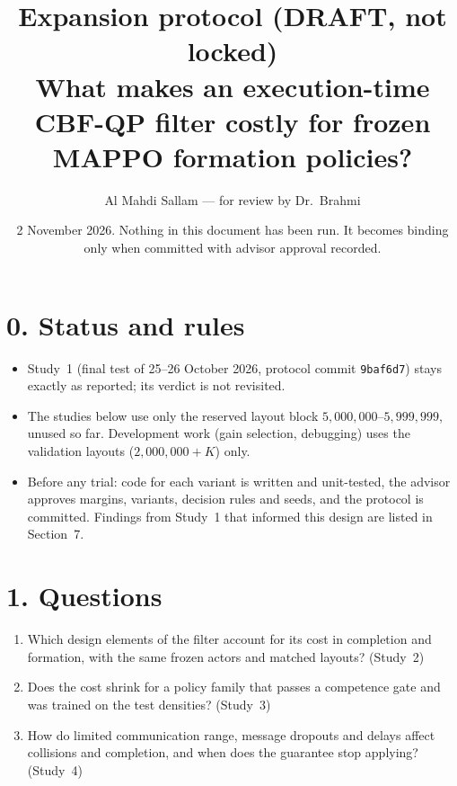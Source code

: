 \documentclass[10pt]{article}
\title{Expansion protocol (DRAFT, not locked)\\ What makes an execution-time CBF-QP filter costly for frozen MAPPO formation policies?}
\author{Al Mahdi Sallam --- for review by Dr.~Brahmi}
\date{2 November 2026. Nothing in this document has been run. It becomes binding only when committed with advisor approval recorded.}
\begin{document}
\maketitle

\section*{0. Status and rules}
\begin{itemize}
\item Study~1 (final test of 25--26 October 2026, protocol commit \texttt{9baf6d7}) stays exactly as reported; its verdict is not revisited.
\item The studies below use only the reserved layout block $5{,}000{,}000$--$5{,}999{,}999$, unused so far. Development work (gain selection, debugging) uses the validation layouts ($2{,}000{,}000+K$) only.
\item Before any trial: code for each variant is written and unit-tested, the advisor approves margins, variants, decision rules and seeds, and the protocol is committed. Findings from Study~1 that informed this design are listed in Section~7.
\end{itemize}

\section*{1. Questions}
\begin{enumerate}[label=Q\arabic*.]
\item Which design elements of the filter account for its cost in completion and formation, with the same frozen actors and matched layouts? (Study~2)
\item Does the cost shrink for a policy family that passes a competence gate and was trained on the test densities? (Study~3)
\item How do limited communication range, message dropouts and delays affect collisions and completion, and when does the guarantee stop applying? (Study~4)
\end{enumerate}
\end{document}
